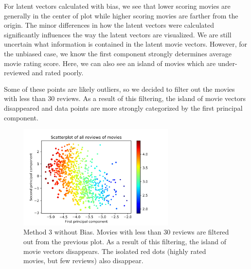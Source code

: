 For latent vectors calculated with bias, we see that lower scoring movies are generally in the center of plot while higher scoring movies are farther from the origin. The minor differences in how the latent vectors were calculated significantly influences the way the latent vectors are visualized. We are still uncertain what information is contained in the latent movie vectors. However, for the unbiased case, we know the first component strongly determines average movie rating score. Here, we can also see an island of movies which are under-reviewed and rated poorly. \newline

Some of these points are likely outliers, so we decided to filter out the movies with less than 30 reviews. As a result of this filtering, the island of movie vectors disappeared and data points are more strongly categorized by the first principal component.

\begin{figure}[H]
	\centering
	\includegraphics[width=0.7\textwidth]{Scores30Raw.png}
	\caption{Method 3 without Bias. Movies with less than 30 reviews are filtered out from the previous plot. As a result of this filtering, the island of movie vectors disappears. The isolated red dots (highly rated movies, but few reviews) also disappear.}
\end{figure}


